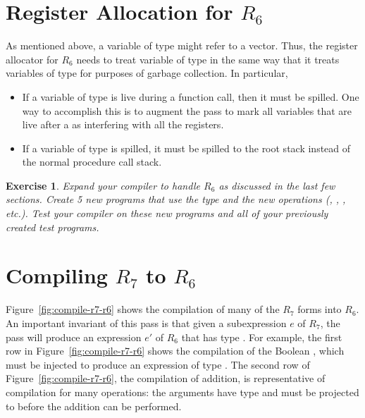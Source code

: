 \documentclass[11pt]{book}
\newtheorem{exercise}[theorem]{Exercise}
\begin{document}

\section{Register Allocation for $R_6$}
\label{sec:register-allocation-r6}

As mentioned above, a variable of type  might refer to a
vector. Thus, the register allocator for $R_6$ needs to treat variable
of type  in the same way that it treats variables of type
 for purposes of garbage collection. In particular,
\begin{itemize}
\item If a variable of type  is live during a function call,
  then it must be spilled. One way to accomplish this is to augment
  the pass  to mark all variables that are
  live after a  as interfering with all the registers.

\item If a variable of type  is spilled, it must be spilled
  to the root stack instead of the normal procedure call stack.
\end{itemize}

\begin{exercise}\normalfont
Expand your compiler to handle $R_6$ as discussed in the last few
sections.  Create 5 new programs that use the  type and the
new operations (, , ,
etc.). Test your compiler on these new programs and all of your
previously created test programs.
\end{exercise}

\section{Compiling $R_7$ to $R_6$}
\label{sec:compile-r7}

Figure~\ref{fig:compile-r7-r6} shows the compilation of many of the
$R_7$ forms into $R_6$. An important invariant of this pass is that
given a subexpression $e$ of $R_7$, the pass will produce an
expression $e'$ of $R_6$ that has type . For example, the
first row in Figure~\ref{fig:compile-r7-r6} shows the compilation of
the Boolean , which must be injected to produce an
expression of type .
%
The second row of Figure~\ref{fig:compile-r7-r6}, the compilation of
addition, is representative of compilation for many operations: the
arguments have type  and must be projected to 
before the addition can be performed.
\end{document}
